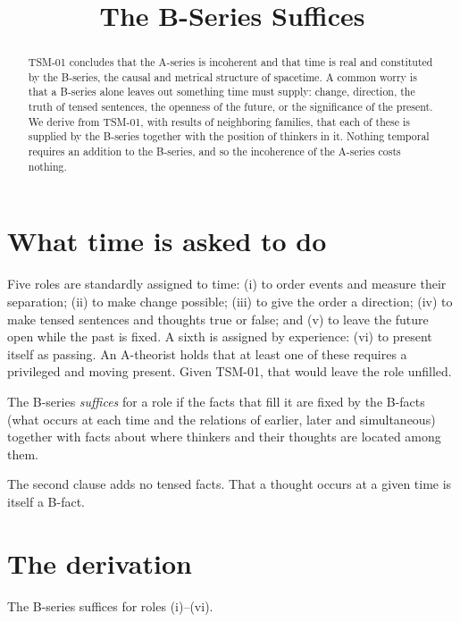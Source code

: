 \documentclass{situationist-preprint}
\title{The B-Series Suffices}
\begin{document}
\maketitle

\begin{abstract}
TSM-01 concludes that the A-series is incoherent and that time is real and constituted by the B-series, the causal and metrical structure of spacetime. A common worry is that a B-series alone leaves out something time must supply: change, direction, the truth of tensed sentences, the openness of the future, or the significance of the present. We derive from TSM-01, with results of neighboring families, that each of these is supplied by the B-series together with the position of thinkers in it. Nothing temporal requires an addition to the B-series, and so the incoherence of the A-series costs nothing.
\end{abstract}

\section{What time is asked to do}

Five roles are standardly assigned to time: (i) to order events and measure their separation; (ii) to make change possible; (iii) to give the order a direction; (iv) to make tensed sentences and thoughts true or false; and (v) to leave the future open while the past is fixed. A sixth is assigned by experience: (vi) to present itself as passing. An A-theorist holds that at least one of these requires a privileged and moving present. Given TSM-01, that would leave the role unfilled.

\begin{definition}[Sufficiency]\label{d:suff}
The B-series \emph{suffices} for a role if the facts that fill it are fixed by the B-facts (what occurs at each time and the relations of earlier, later and simultaneous) together with facts about where thinkers and their thoughts are located among them.
\end{definition}

The second clause adds no tensed facts. That a thought occurs at a given time is itself a B-fact.

\section{The derivation}

\begin{proposition}\label{p:main}
The B-series suffices for roles (i)--(vi).
\end{proposition}
\end{document}
